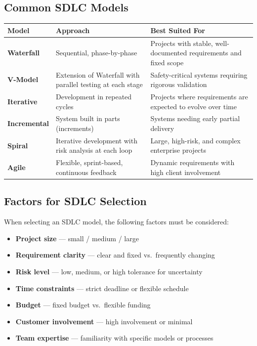\documentclass[12pt, a4paper]{article}
\begin{document}
\subsection{Common SDLC Models}

\vspace{6pt}
\renewcommand{\arraystretch}{1.5}
\begin{tabular}{|L{2.8cm}|L{4.5cm}|L{7.5cm}|}
  \hline
  \textbf{\color{white}Model} &
  \textbf{\color{white}Approach} &
  \textbf{\color{white}Best Suited For} \\
  \hline
  \textbf{Waterfall} & Sequential, phase-by-phase & Projects with stable, well-documented requirements and fixed scope \\
  \hline
  \textbf{V-Model} & Extension of Waterfall with parallel testing at each stage & Safety-critical systems requiring rigorous validation \\
  \hline
  \textbf{Iterative} & Development in repeated cycles & Projects where requirements are expected to evolve over time \\
  \hline
  \textbf{Incremental} & System built in parts (increments) & Systems needing early partial delivery \\
  \hline
  \textbf{Spiral} & Iterative development with risk analysis at each loop & Large, high-risk, and complex enterprise projects \\
  \hline
  \textbf{Agile} & Flexible, sprint-based, continuous feedback & Dynamic requirements with high client involvement \\
  \hline
\end{tabular}

\subsection{Factors for SDLC Selection}

When selecting an SDLC model, the following factors must be considered:

\begin{itemize}[leftmargin=1.5em, itemsep=4pt]
  \item \textbf{Project size} --- small / medium / large
  \item \textbf{Requirement clarity} --- clear and fixed vs.\ frequently changing
  \item \textbf{Risk level} --- low, medium, or high tolerance for uncertainty
  \item \textbf{Time constraints} --- strict deadline or flexible schedule
  \item \textbf{Budget} --- fixed budget vs.\ flexible funding
  \item \textbf{Customer involvement} --- high involvement or minimal
  \item \textbf{Team expertise} --- familiarity with specific models or processes
\end{itemize}
\end{document}
